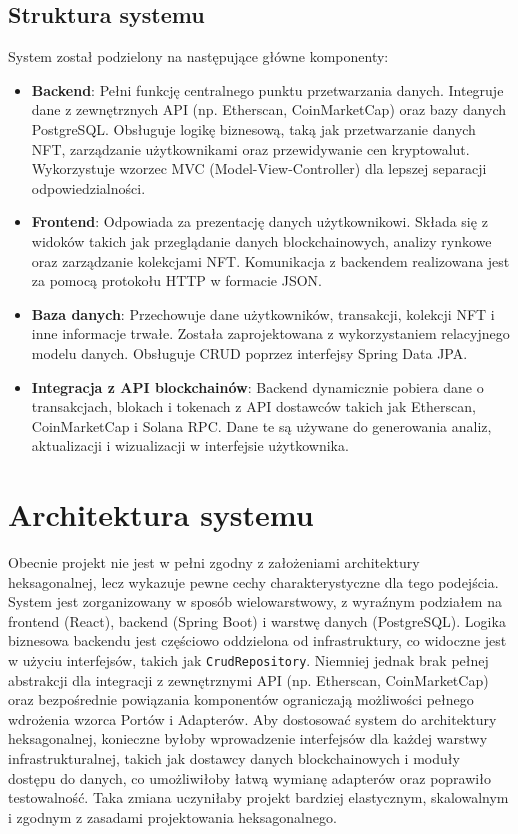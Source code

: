 \subsection{Struktura systemu}
System został podzielony na następujące główne komponenty:
\begin{itemize}
    \item \textbf{Backend}: Pełni funkcję centralnego punktu przetwarzania danych. Integruje dane z zewnętrznych API (np. Etherscan, CoinMarketCap) oraz bazy danych PostgreSQL. Obsługuje logikę biznesową, taką jak przetwarzanie danych NFT, zarządzanie użytkownikami oraz przewidywanie cen kryptowalut. Wykorzystuje wzorzec MVC (Model-View-Controller) dla lepszej separacji odpowiedzialności.
    \item \textbf{Frontend}: Odpowiada za prezentację danych użytkownikowi. Składa się z widoków takich jak przeglądanie danych blockchainowych, analizy rynkowe oraz zarządzanie kolekcjami NFT. Komunikacja z backendem realizowana jest za pomocą protokołu HTTP w formacie JSON.
    \item \textbf{Baza danych}: Przechowuje dane użytkowników, transakcji, kolekcji NFT i inne informacje trwałe. Została zaprojektowana z wykorzystaniem relacyjnego modelu danych. Obsługuje CRUD poprzez interfejsy Spring Data JPA.
    \item \textbf{Integracja z API blockchainów}: Backend dynamicznie pobiera dane o transakcjach, blokach i tokenach z API dostawców takich jak Etherscan, CoinMarketCap i Solana RPC. Dane te są używane do generowania analiz, aktualizacji i wizualizacji w interfejsie użytkownika.
\end{itemize}

\section{Architektura systemu}

Obecnie projekt nie jest w pełni zgodny z założeniami architektury heksagonalnej, lecz wykazuje pewne cechy charakterystyczne dla tego podejścia. System jest zorganizowany w sposób wielowarstwowy, z wyraźnym podziałem na frontend (React), backend (Spring Boot) i warstwę danych (PostgreSQL). Logika biznesowa backendu jest częściowo oddzielona od infrastruktury, co widoczne jest w użyciu interfejsów, takich jak \texttt{CrudRepository}. Niemniej jednak brak pełnej abstrakcji dla integracji z zewnętrznymi API (np. Etherscan, CoinMarketCap) oraz bezpośrednie powiązania komponentów ograniczają możliwości pełnego wdrożenia wzorca Portów i Adapterów. Aby dostosować system do architektury heksagonalnej, konieczne byłoby wprowadzenie interfejsów dla każdej warstwy infrastrukturalnej, takich jak dostawcy danych blockchainowych i moduły dostępu do danych, co umożliwiłoby łatwą wymianę adapterów oraz poprawiło testowalność. Taka zmiana uczyniłaby projekt bardziej elastycznym, skalowalnym i zgodnym z zasadami projektowania heksagonalnego.

